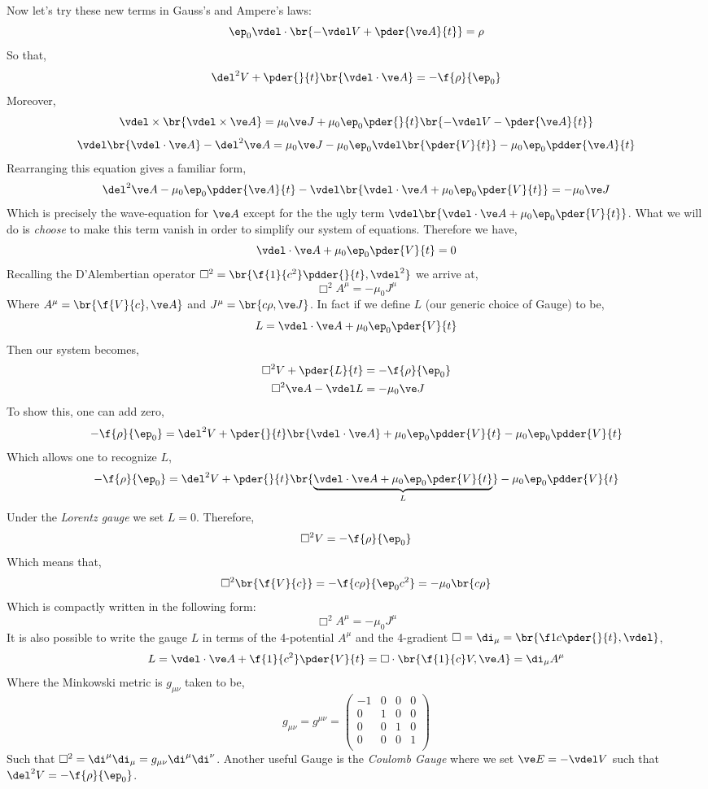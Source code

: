 \documentclass{article}
\begin{document}
Now let's try these new terms in Gauss's and Ampere's laws:
\[ \ep_0\vdel \cdot \br{-\vdel V + \pder{\ve A}{t}} = \rho \]
So that,
\[ \del^2 V + \pder{}{t}\br{\vdel \cdot \ve A} = -\f{\rho}{\ep_0} \]
Moreover,
\[ \vdel \times \br{\vdel \times \ve A} = \mu_0 \ve J + \mu_0 \ep_0 \pder{}{t} \br{-\vdel V - \pder{\ve A}{t}}\]
\[ \vdel \br{\vdel \cdot \ve A} - \del^2 \ve A = \mu_0 \ve J - \mu_0 \ep_0 \vdel \br{\pder{V}{t}} - \mu_0 \ep_0 \pdder{\ve A}{t} \]
Rearranging this equation gives a familiar form,
\[ \del^2 \ve A - \mu_0 \ep_0 \pdder{\ve A}{t} - \vdel \br{\vdel \cdot \ve A + \mu_0 \ep_0 \pder{V}{t}} = - \mu_0 \ve J \]
Which is precisely the wave-equation for $\ve A$ except for the the ugly term $\vdel\br{\vdel \cdot \ve A + \mu_0 \ep_0 \pder{V}{t}}$. What we will do is \textit{choose} to make this term vanish in order to simplify our system of equations. Therefore we have,
\[ \vdel \cdot \ve A + \mu_0 \ep_0 \pder{V}{t} = 0 \]
Recalling the D'Alembertian operator $\Box^2 = \br{\f{1}{c^2} \pdder{}{t}, \vdel^2}$ we arrive at,
\[ \Box^2 A^{\mu} = -\mu_0 J^{\mu} \]
Where $A^{\mu} = \br{\f{V}{c}, \ve A}$ and $J^{\mu} = \br{c \rho, \ve J}$. In fact if we define $L$ (our generic choice of Gauge) to be,
\[ L = \vdel \cdot \ve A + \mu_0 \ep_0 \pder{V}{t} \]
Then our system becomes,
\begin{align*}
    \Box^2 V + \pder{L}{t} &= - \f{\rho}{\ep_0} \\
    \Box^2 \ve A - \vdel L &= - \mu_0 \ve J
\end{align*}
To show this, one can add zero,
\[ -\f{\rho}{\ep_0} = \del^2 V + \pder{}{t}\br{\vdel \cdot \ve A} + \mu_0 \ep_0 \pdder{V}{t} - \mu_0 \ep_0 \pdder{V}{t}\]
Which allows one to recognize $L$,
\[ -\f{\rho}{\ep_0} = \del^2 V + \pder{}{t}\br{\underbrace{\vdel \cdot \ve A + \mu_0 \ep_0 \pder{V}{t}}_{L}} - \mu_0 \ep_0 \pdder{V}{t}\]
Under the \textit{Lorentz gauge} we set $L = 0$. Therefore,
\[ \Box^2 V = - \f{\rho}{\ep_0} \]
Which means that,
\[ \Box^2 \br{\f{V}{c}} = - \f{c\rho}{\ep_0 c^2} = - \mu_0 \br{c \rho} \]
Which is compactly written in the following form:
\[ \Box^2 A^{\mu} = -\mu_0 J^{\mu} \]
It is also possible to write the gauge $L$ in terms of the 4-potential $A^{\mu}$ and the 4-gradient $\Box = \di_\mu = \br{\f1c\pder{}{t}, \vdel}$,
\[ L = \vdel \cdot \ve A + \f{1}{c^2} \pder{V}{t} = \Box \cdot \br{\f{1}{c} V, \ve A}  = \di_{\mu} A^{\mu} \]
Where the Minkowski metric is $g_{\mu\nu}$ taken to be,
\[ g_{\mu\nu} = g^{\mu\nu} = \begin{pmatrix}
    -1 & 0 & 0 & 0 \\
     0 & 1 & 0 & 0 \\
     0 & 0 & 1 & 0 \\
     0 & 0 & 0 & 1 \\
\end{pmatrix} \]
Such that $\Box^2 = \di^{\mu}\di_{\mu} = g_{\mu\nu} \di^{\mu}\di^{\nu}$. Another useful Gauge is the \textit{Coulomb Gauge} where we set $\ve E= - \vdel V$ such that $\del^2 V = - \f{\rho}{\ep_0}$.

\end{document}
